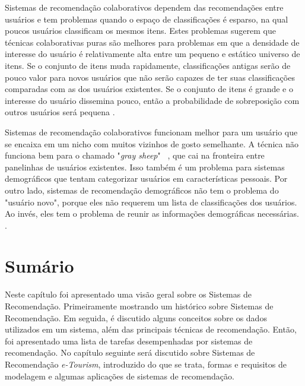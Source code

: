 Sistemas de recomendação colaborativos dependem das recomendações entre usuários e tem problemas quando o espaço de classificações é esparso, na qual poucos usuários classificam os mesmos itens. Estes problemas sugerem que técnicas colaborativas puras são melhores para problemas em que a densidade de interesse do usuário é relativamente alta entre um pequeno e estático universo de itens. Se o conjunto de itens muda rapidamente, classificações antigas serão de pouco valor para novos usuários que não serão capazes de ter suas classificações comparadas com as dos usuários existentes. Se o conjunto de itens é grande e o interesse do usuário dissemina pouco, então a probabilidade de sobreposição com outros usuários será pequena \citep{Burke2002}.

Sistemas de recomendação colaborativos funcionam melhor para um usuário que se encaixa em um nicho com muitos vizinhos de gosto semelhante. A técnica não funciona bem para o chamado "\textit{gray sheep}"~ \citep{claypool99}, que cai na fronteira entre panelinhas de usuários existentes. Isso também é um problema para sistemas demográficos que tentam categorizar usuários em características pessoais. Por outro lado, sistemas de recomendação demográficos não tem o problema do "usuário novo", porque eles não requerem um lista de classificações dos usuários. Ao invés, eles tem o problema de reunir as informações demográficas necessárias. \citep{Burke2002}.


\section{Sumário}
\label{sec:summaryRecSys}

Neste capítulo foi apresentado uma visão geral sobre os Sistemas de Recomendação. Primeiramente mostrando um histórico sobre Sistemas de Recomendação. Em seguida, é discutido alguns conceitos sobre os dados utilizados em um sistema, além das principais técnicas de recomendação. Então, foi apresentado uma lista de tarefas desempenhadas por sistemas de recomendação. No capítulo seguinte será discutido sobre Sistemas de Recomendação \textit{e-Tourism}, introduzido do que se trata, formas e requisitos de modelagem e algumas aplicações de sistemas de recomendação.